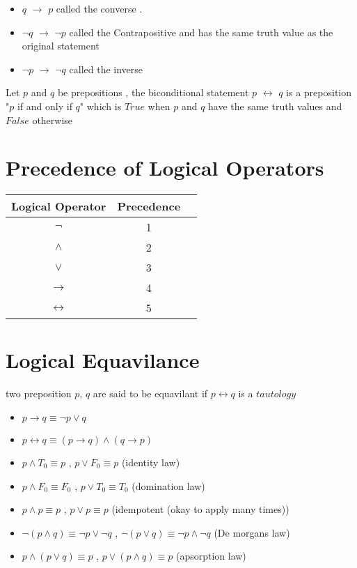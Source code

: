 \documentclass[a4paper]{article}
\begin{document}
\begin{itemize}
  \item $q$ $\rightarrow$ $p$ called the converse .
  \item $\neg q$ $\rightarrow$ $\neg p$ called the Contrapositive and has the same truth value as the original statement
  \item $\neg p$ $\rightarrow$ $\neg q$ called the inverse 
\end{itemize}
\begin{definition}
  Let $p$ and $q$ be prepositions , the biconditional statement $p$ $\leftrightarrow$ $q$ is a preposition "$p$ if and only if $q$" which is $True$ when $p$ and $q$ have the same truth values and $False$ otherwise 
\end{definition}
\section{Precedence of Logical Operators}
\begin{tabular}{|c|c|c|}
 \hline
 Logical Operator & Precedence \\
 \hline
 $\neg$ & 1\\
 \hline
 $\wedge$ & 2\\
 $\vee$ & 3\\
 \hline
 $\rightarrow$ & 4\\
 $\leftrightarrow $& 5\\
 \hline
\end{tabular}
\section{Logical Equavilance}
two preposition $p$, $q$ are said to be equavilant if $p\leftrightarrow q$ is a $tautology$
\begin{itemize}
  \item $p\rightarrow q \equiv \neg p \vee q$
  \item $p\leftrightarrow q \equiv (p\rightarrow q)\wedge (q\rightarrow p)$
  \item $p \wedge T_{0} \equiv p$ , $p \vee F_{0} \equiv p$ (identity law)
  \item $p \wedge F_{0} \equiv F_{0}$ , $p \vee T_{0} \equiv T_{0}$ (domination law)
  \item $p \wedge p\equiv p$ , $p \vee p \equiv p$ (idempotent (okay to apply many times))
  \item $\neg (p \wedge q) \equiv \neg p \vee \neg q$ , $\neg (p \vee q) \equiv \neg p \wedge \neg q$ (De morgans law)
  \item $ p \wedge (p \vee q) \equiv p$ , $p \vee (p \wedge q)\equiv p$ (apsorption law)
\end{itemize}
\end{document}

